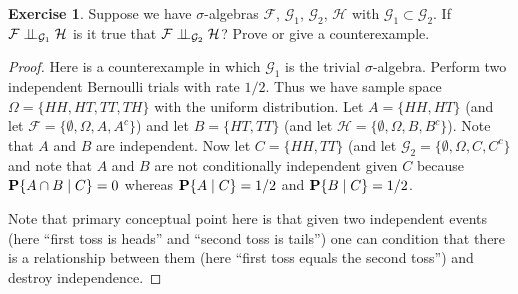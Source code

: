 \documentclass{amsart}
\theoremstyle{remark}
\theoremstyle{definition}
\newtheorem{ex}[thm]{Exercise}
\begin{document}
\begin{ex}Suppose we have $\sigma$-algebras $\mathcal{F}$,
  $\mathcal{G}_1$, $\mathcal{G}_2$, $\mathcal{H}$ with $\mathcal{G}_1
  \subset \mathcal{G}_2$.  If
  $\cindependent{\mathcal{F}}{\mathcal{H}}{\mathcal{G}_1}$
is it true that $\cindependent{\mathcal{F}}{\mathcal{H}}{\mathcal{G}_2}$?
Prove or give a counterexample.
\end{ex}
\begin{proof}
Here is a counterexample in which $\mathcal{G}_1$ is the trivial
$\sigma$-algebra.  Perform two independent Bernoulli trials with rate
$1/2$.  Thus we have sample space $\Omega = \lbrace HH, HT, TT, TH
\rbrace$ with the uniform distribution.  Let $A = \lbrace HH, HT
\rbrace$ (and let $\mathcal{F} = \lbrace \emptyset, \Omega, A, A^c
\rbrace$) and let $B = \lbrace HT, TT \rbrace$ (and let $\mathcal{H} =
\lbrace \emptyset , \Omega, B, B^c \rbrace$).  Note that $A$ and $B$
are independent.  Now let $C = \lbrace HH, TT \rbrace$ (and let
$\mathcal{G}_2 = \lbrace \emptyset, \Omega, C, C^c \rbrace$ and note
that $A$ and $B$ are not conditionally independent given $C$ because
$\cprobability{C}{A \cap B} = 0$ whereas $\cprobability{C}{A} = 1/2$
and $\cprobability{C}{B} = 1/2$.

Note
that primary conceptual point here is that given two independent
events (here ``first toss is heads'' and ``second toss is tails'') one
can condition that there is a relationship between them (here ``first toss
equals the second toss'') and destroy independence.  
\end{proof}
\end{document}
